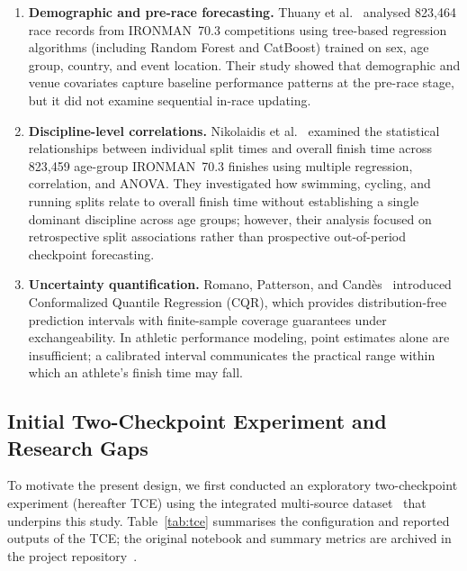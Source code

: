 \documentclass[11pt,a4paper]{article}
\begin{document}
\begin{enumerate}[leftmargin=*]
  \item \textbf{Demographic and pre-race forecasting.}
  Thuany et al.~\cite{thuany2025modeling} analysed 823{,}464 race
  records from IRONMAN~70.3 competitions using tree-based regression
  algorithms (including Random Forest and CatBoost) trained on sex,
  age group, country, and event location. Their study showed that
  demographic and venue covariates capture baseline performance patterns
  at the pre-race stage, but it did not examine sequential in-race
  updating.

  \item \textbf{Discipline-level correlations.}
  Nikolaidis et al.~\cite{nikolaidis2023predicting} examined the
  statistical relationships between individual split times and overall
  finish time across 823{,}459 age-group IRONMAN~70.3 finishes using
  multiple regression, correlation, and ANOVA. They investigated how
  swimming, cycling, and running splits relate to overall finish time
  without establishing a single dominant discipline across age groups;
  however, their analysis focused on retrospective split associations
  rather than prospective out-of-period checkpoint forecasting.

  \item \textbf{Uncertainty quantification.}
  Romano, Patterson, and Cand\`{e}s~\cite{romano2019conformalized}
  introduced Conformalized Quantile Regression (CQR), which provides
  distribution-free prediction intervals with finite-sample coverage
  guarantees under exchangeability. In athletic performance modeling,
  point estimates alone are insufficient; a calibrated interval
  communicates the practical range within which an athlete's finish
  time may fall.
\end{enumerate}

\subsection{Initial Two-Checkpoint Experiment and Research Gaps}
\label{sec:tce}

To motivate the present design, we first conducted an exploratory
two-checkpoint experiment (hereafter TCE) using the integrated
multi-source dataset~\cite{kaggle_dataset} that underpins this study.
Table~\ref{tab:tce} summarises the configuration and reported outputs
of the TCE; the original notebook and summary metrics are archived in
the project repository~\cite{repo_artifact}.
\end{document}
